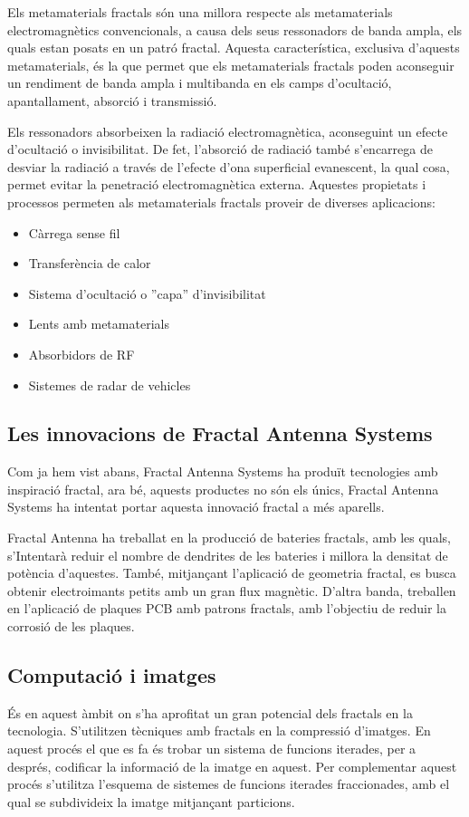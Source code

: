 \documentclass[12pt,a4paper]{report}
\begin{document}
Els metamaterials fractals són una millora respecte als metamaterials electromagnètics convencionals, a causa dels seus ressonadors de banda ampla, els quals estan posats en un patró fractal. Aquesta característica, exclusiva d'aquests metamaterials, és la que permet que els metamaterials fractals poden aconseguir un rendiment de banda ampla i multibanda en els camps d'ocultació, apantallament, absorció i transmissió.

Els ressonadors absorbeixen la radiació electromagnètica, aconseguint un efecte d'ocultació o invisibilitat. De fet, l'absorció de radiació també s'encarrega de desviar la radiació a través de l'efecte d'ona superficial evanescent, la qual cosa, permet evitar la penetració electromagnètica externa. Aquestes propietats i processos permeten als metamaterials fractals proveir de diverses aplicacions:
\begin{itemize}
\item Càrrega sense fil
\item Transferència de calor
\item Sistema d'ocultació o ''capa'' d'invisibilitat
\item Lents amb metamaterials
\item Absorbidors de RF
\item Sistemes de radar de vehicles
\end{itemize} 

\subsection{Les innovacions de Fractal Antenna Systems}
Com ja hem vist abans, Fractal Antenna Systems ha produït tecnologies amb inspiració fractal, ara bé, aquests productes no són els únics, Fractal Antenna Systems ha intentat portar aquesta innovació fractal a més aparells. 

Fractal Antenna ha treballat en la producció de bateries fractals, amb les quals, s'Intentarà reduir el nombre de dendrites de les bateries i millora la densitat de potència d’aquestes. També, mitjançant l'aplicació de geometria fractal, es busca obtenir electroimants petits amb un gran flux magnètic. D’altra banda, treballen en l’aplicació de plaques PCB amb patrons fractals, amb l’objectiu de reduir la corrosió de les plaques.

\subsection{Computació i imatges}
És en aquest àmbit on s'ha aprofitat un gran potencial dels fractals en la tecnologia. S'utilitzen tècniques amb fractals en la compressió d'imatges. En aquest procés el que es fa és trobar un sistema de funcions iterades, per a després, codificar la informació de la imatge en aquest. Per complementar aquest procés s'utilitza l'esquema de sistemes de funcions iterades fraccionades, amb el qual se subdivideix la imatge mitjançant particions. 
\end{document}
